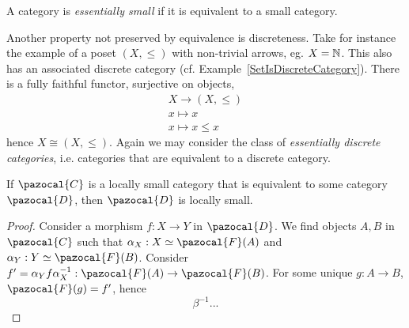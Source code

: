     \begin{definition}
        A category is \emph{essentially small} if it is equivalent to a small category.
    \end{definition}
    Another property not preserved by equivalence is discreteness. Take for instance the example of a poset $(X,\leq)$ with non-trivial arrows, eg. $X=\mathbb{N}$. This also has an associated discrete category (cf. Example~\ref{SetIsDiscreteCategory}). There is a fully faithful functor, surjective on objects, 
    \begin{gather*}
        X\rightarrow (X,\leq)\\
        x\mapsto x\\
        x\mapsto x\leq x
    \end{gather*}
    hence $X\cong (X,\leq)$. Again we may consider the class of \emph{essentially discrete categories}, i.e. categories that are equivalent to a discrete category.
    \begin{proposition}
        If $\pazocal{C}$ is a locally small category that is equivalent to some category $\pazocal{D}$, then $\pazocal{D}$ is locally small. 
    \end{proposition}
    \begin{proof}
        Consider a morphism $f: X\rightarrow Y$ in $\pazocal{D}$. We find objects $A,B$ in $\pazocal{C}$ such that $\alpha_X: X\simeq \pazocal{F}(A)$ and $\alpha_Y : Y\simeq \pazocal{F}(B)$. Consider $f' = \alpha_Y f \alpha_X^{-1} : \pazocal{F}(A)\rightarrow \pazocal{F}(B)$. For some unique $g: A\rightarrow B$, $\pazocal{F}(g)=f'$, hence 
        $$
            \beta^{-1}...
        $$ 
    \end{proof}
